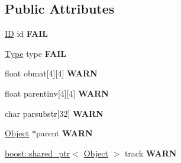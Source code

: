 \subsection*{Public Attributes}
\begin{DoxyCompactItemize}
\item 
\hypertarget{struct_assimp_1_1_blender_1_1_object_a678a5e1c0c0deb19bc86b55a57a08c50}{\hyperlink{struct_assimp_1_1_blender_1_1_i_d}{I\+D} id {\bfseries F\+A\+I\+L}}\label{struct_assimp_1_1_blender_1_1_object_a678a5e1c0c0deb19bc86b55a57a08c50}

\item 
\hypertarget{struct_assimp_1_1_blender_1_1_object_a7b74ca76f100b1e66f2d8b9a9ed43ef1}{\hyperlink{struct_type}{Type} type {\bfseries F\+A\+I\+L}}\label{struct_assimp_1_1_blender_1_1_object_a7b74ca76f100b1e66f2d8b9a9ed43ef1}

\item 
\hypertarget{struct_assimp_1_1_blender_1_1_object_a99c050d5b6bc3322e3f303da86e1caf8}{float obmat\mbox{[}4\mbox{]}\mbox{[}4\mbox{]} {\bfseries W\+A\+R\+N}}\label{struct_assimp_1_1_blender_1_1_object_a99c050d5b6bc3322e3f303da86e1caf8}

\item 
\hypertarget{struct_assimp_1_1_blender_1_1_object_af2cf99770f08a986fcbc3b894b23eb6b}{float parentinv\mbox{[}4\mbox{]}\mbox{[}4\mbox{]} {\bfseries W\+A\+R\+N}}\label{struct_assimp_1_1_blender_1_1_object_af2cf99770f08a986fcbc3b894b23eb6b}

\item 
\hypertarget{struct_assimp_1_1_blender_1_1_object_af3fb020810842877f9c0e6a735dceaf9}{char parsubstr\mbox{[}32\mbox{]} {\bfseries W\+A\+R\+N}}\label{struct_assimp_1_1_blender_1_1_object_af3fb020810842877f9c0e6a735dceaf9}

\item 
\hypertarget{struct_assimp_1_1_blender_1_1_object_a05674fad62a4889919af4cddb762abea}{\hyperlink{struct_assimp_1_1_blender_1_1_object}{Object} $\ast$parent {\bfseries W\+A\+R\+N}}\label{struct_assimp_1_1_blender_1_1_object_a05674fad62a4889919af4cddb762abea}

\item 
\hypertarget{struct_assimp_1_1_blender_1_1_object_a06c3f2c3f534149a88775d899a87af37}{\hyperlink{classboost_1_1shared__ptr}{boost\+::shared\+\_\+ptr}$<$ \hyperlink{struct_assimp_1_1_blender_1_1_object}{Object} $>$ track {\bfseries W\+A\+R\+N}}\label{struct_assimp_1_1_blender_1_1_object_a06c3f2c3f534149a88775d899a87af37}


\end{DoxyCompactItemize}
